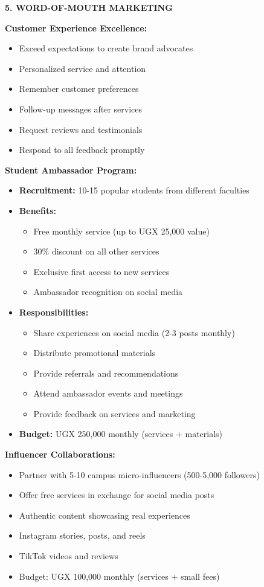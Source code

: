 \vspace{1em}

\textbf{5. WORD-OF-MOUTH MARKETING}

\textbf{Customer Experience Excellence:}
\begin{itemize}[leftmargin=2em]
    \item Exceed expectations to create brand advocates
    \item Personalized service and attention
    \item Remember customer preferences
    \item Follow-up messages after services
    \item Request reviews and testimonials
    \item Respond to all feedback promptly
\end{itemize}

\textbf{Student Ambassador Program:}
\begin{itemize}[leftmargin=2em]
    \item \textbf{Recruitment:} 10-15 popular students from different faculties
    \item \textbf{Benefits:}
    \begin{itemize}
        \item Free monthly service (up to UGX 25,000 value)
        \item 30\% discount on all other services
        \item Exclusive first access to new services
        \item Ambassador recognition on social media
    \end{itemize}
    \item \textbf{Responsibilities:}
    \begin{itemize}
        \item Share experiences on social media (2-3 posts monthly)
        \item Distribute promotional materials
        \item Provide referrals and recommendations
        \item Attend ambassador events and meetings
        \item Provide feedback on services and marketing
    \end{itemize}
    \item \textbf{Budget:} UGX 250,000 monthly (services + materials)
\end{itemize}

\textbf{Influencer Collaborations:}
\begin{itemize}[leftmargin=2em]
    \item Partner with 5-10 campus micro-influencers (500-5,000 followers)
    \item Offer free services in exchange for social media posts
    \item Authentic content showcasing real experiences
    \item Instagram stories, posts, and reels
    \item TikTok videos and reviews
    \item Budget: UGX 100,000 monthly (services + small fees)
\end{itemize}

